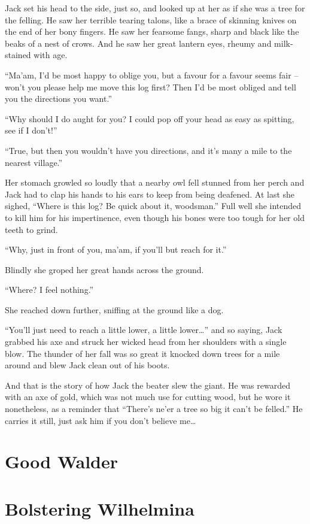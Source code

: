 \documentclass[twoside,11pt,b5paper,twocolumn]{scrbook}
\begin{document}
Jack set his head to the side, just so, and looked up at her as if she was a tree for the felling. He saw her terrible tearing talons, like a brace of skinning knives on the end of her bony fingers. He saw her fearsome fangs, sharp and black like the beaks of a nest of crows. And he saw her great lantern eyes, rheumy and milk-stained with age.

“Ma’am, I’d be most happy to oblige you, but a favour for a favour seems fair – won’t you please help me move this log first? Then I’d be most obliged and tell you the directions you want.”

“Why should I do aught for you? I could pop off your head as easy as spitting, see if I don’t!”

“True, but then you wouldn’t have you directions, and it’s many a mile to the nearest village.”

Her stomach growled so loudly that a nearby owl fell stunned from her perch and Jack had to clap his hands to his ears to keep from being deafened. At last she sighed, “Where is this log? Be quick about it, woodsman.” Full well she intended to kill him for his impertinence, even though his bones were too tough for her old teeth to grind.

“Why, just in front of you, ma’am, if you’ll but reach for it.”

Blindly she groped her great hands across the ground.

“Where? I feel nothing.”

She reached down further, sniffing at the ground like a dog.

“You’ll just need to reach a little lower, a little lower…” and so saying, Jack grabbed his axe and struck her wicked head from her shoulders with a single blow. The thunder of her fall was so great it knocked down trees for a mile around and blew Jack clean out of his boots.

And that is the story of how Jack the beater slew the giant. He was rewarded with an axe of gold, which was not much use for cutting wood, but he wore it nonetheless, as a reminder that “There’s ne’er a tree so big it can’t be felled.” He carries it still, just ask him if you don’t believe me… 
\section{Good Walder}
\section{Bolstering Wilhelmina}
\end{document}
